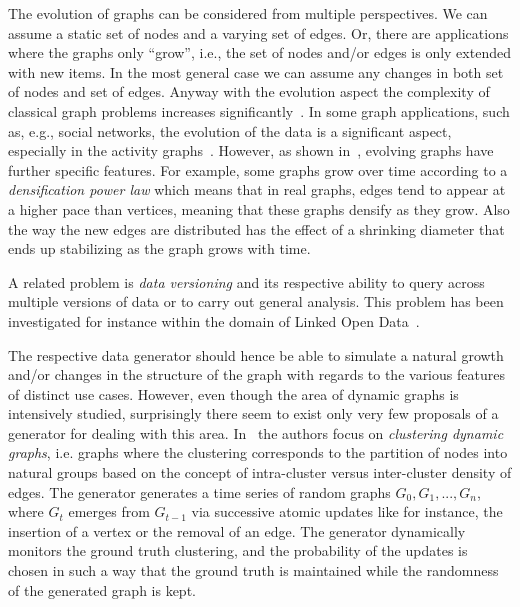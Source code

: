 The evolution of graphs can be considered from multiple perspectives. We can
assume a static set of nodes and a varying set of edges.  Or, there are
applications where the graphs only ``grow'', i.e., the set of nodes and/or edges
is only extended with new items. In the most general case we can assume any
changes in both set of nodes and set of edges. Anyway with the evolution aspect
the complexity of classical graph problems increases
significantly~\cite{Michail2015,Wu:2014:PPT:2732939.2732945}. In some graph
applications, such as, e.g., social networks, the evolution of the data is a
significant aspect, especially in the activity
graphs~\cite{doreian1997evolution,Kumar:2006:SEO:1150402.1150476,Hellmann2014583,wang2013,Kossinets88,Viswanath:2009:EUI:1592665.1592675}.
However, as shown
in~\cite{Leskovec:2005:RMT:2101235.2101254,Leskovec:2005:GOT:1081870.1081893},
evolving graphs have further specific features. For example, some graphs grow
over time according to a \emph{densification power law} which means that in real
graphs, edges tend to appear at a higher pace than vertices, meaning that these
graphs densify as they grow. Also the way the new edges are distributed has the
effect of a shrinking diameter that ends up stabilizing as the graph grows with time.

A related problem is \emph{data versioning} and its respective ability to query across multiple versions of data or to carry out general analysis.
This problem has been investigated for instance within the domain of Linked
Open Data~\cite{DBLP:conf/semweb/Papakonstantinou16,DBLP:conf/esws/MeimarisP16,fernandez2015towards,fernandez2015bear}.


The respective data generator should hence be able to simulate a natural growth
and/or changes in the structure of the graph with regards to the various
features of distinct use cases. However,  even though the area of dynamic graphs
is intensively studied, surprisingly there seem to exist only very few proposals
of a generator for dealing with this area.
In~\cite{GoerkeKlugeSchumm2012_1000029825} the authors focus on \emph{clustering
dynamic graphs}, i.e. graphs where the clustering corresponds to the partition
of nodes into natural groups based on the concept of intra-cluster
versus inter-cluster density of edges. The generator generates a time series
of random graphs $G_0, G_1, ..., G_n$, where $G_t$ emerges from $G_{t-1}$ via
successive atomic updates like for instance, the insertion of a vertex or the removal of an
edge. The generator dynamically monitors the ground truth clustering, and the probability
of the updates is chosen in such a way that the ground truth is
maintained while the randomness of the generated graph is kept.

